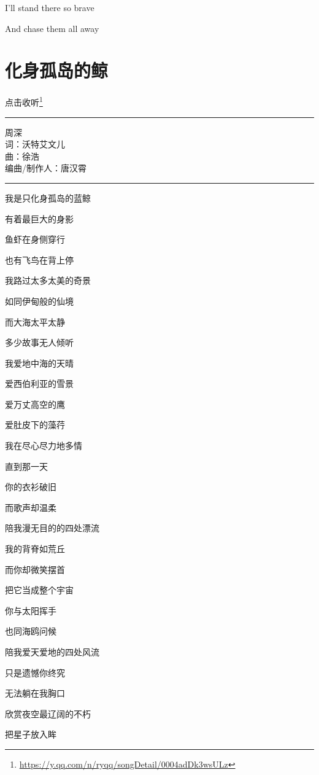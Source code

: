\documentclass[]{ctexbook}
\renewcommand{\href}[2]{#2\footnote{\url{#1}}}
\begin{document}
I'll stand there so brave

And chase them all away

\section*{化身孤岛的鲸}\label{hua-shen-gu-dao-de-jing}


\href{https://y.qq.com/n/ryqq/songDetail/0004adDk3wsULz}{点击收听}

\begin{center}\rule{0.5\linewidth}{0.5pt}\end{center}

周深\\
词：沃特艾文儿\\
曲：徐浩\\
编曲/制作人：唐汉霄

\begin{center}\rule{0.5\linewidth}{0.5pt}\end{center}

我是只化身孤岛的蓝鲸

有着最巨大的身影

鱼虾在身侧穿行

也有飞鸟在背上停

我路过太多太美的奇景

如同伊甸般的仙境

而大海太平太静

多少故事无人倾听

我爱地中海的天晴

爱西伯利亚的雪景

爱万丈高空的鹰

爱肚皮下的藻荇

我在尽心尽力地多情

直到那一天

你的衣衫破旧

而歌声却温柔

陪我漫无目的的四处漂流

我的背脊如荒丘

而你却微笑摆首

把它当成整个宇宙

你与太阳挥手

也同海鸥问候

陪我爱天爱地的四处风流

只是遗憾你终究

无法躺在我胸口

欣赏夜空最辽阔的不朽

把星子放入眸
\end{document}
